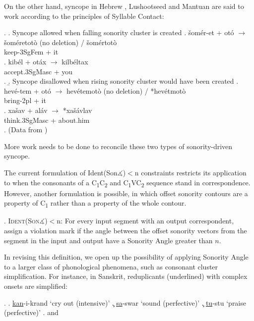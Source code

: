 \documentclass[12pt]{article}
\begin{document}
On the other hand, syncope in Hebrew \citep{landau.1997}, Lushootseed \citep{urbanczyk.1996} and Mantuan \citep{miglio.1998} are said to work according to the principles of Syllable Contact:

\ex. \a. Syncope allowed when falling sonority cluster is created
     \ag. \v{s}om\'er-et + ot\'o $\rightarrow$ \v{s}om\'eretot\`o (no deletion) / \v{s}om\'ertot\`o \\
          keep-3SgFem + it \\
     \bg. kib\'el + ot\'ax $\rightarrow$ kilb\'eltax \\
          accept.3SgMasc + you \\
     \z.
     \b. Syncope disallowed when rising sonority cluster would have been created
     \ag. hev\'e-tem + ot\'o $\rightarrow$ hev\'etemot\`o (no deletion) / *hev\'etmot\`o \\
          bring-2pl + it \\
     \bg. xa\v{s}av + al\'av $\rightarrow$ *xa\v{s}\'avlav \\
          think.3SgMasc + about.him \\
     \z.
     (Data from \citep{landau.1997})

More work needs to be done to reconcile these two types of sonority-driven syncope.

\bigskip

 The current formulation of {\sc Ident(Son$\measuredangle$)}$<$n constraints restricts its application to when the consonants of a C\textsubscript{1}C\textsubscript{2} and C\textsubscript{1}VC\textsubscript{2} sequence stand in correspondence. However, another formulation is possible, in which offset sonority contours are a property of C\textsubscript{1} rather than a property of the whole contour.

\ex. \textsc{Ident(Son$\measuredangle$)}$<$n: For every input segment with an output correspondent, assign a violation mark if the angle between the offset sonority vectors from the segment in the input and output have a {\sc Sonority Angle} greater than $n$.

In revising this definition, we open up the possibility of applying {\sc Sonority Angle} to a larger class of phonological phenomena, such as consonant cluster simplification. For instance, in Sanskrit, reduplicants (underlined) with complex onsets are simplified:

\ex. \a. \underline{kan}-i-krand `cry out (intensive)'
     \c. \underline{sa}-swar `sound (perfective)'
     \c. \underline{tu}-stu `praise (perfective)'
     \z.
     \citep{steriade.1988} and \citep{parker.2002}
\end{document}
